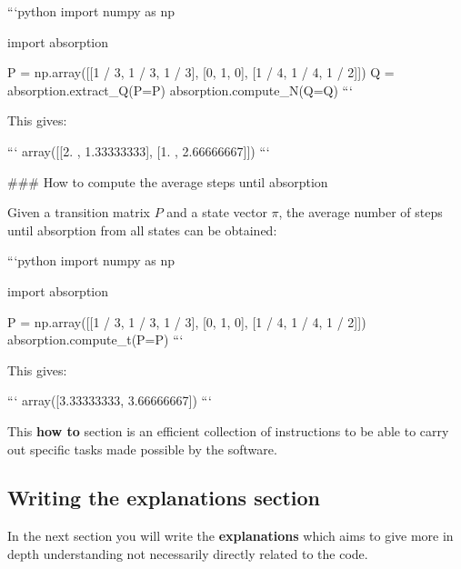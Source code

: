 \begin{md}
```python
import numpy as np

import absorption

P = np.array([[1 / 3, 1 / 3, 1 / 3], [0, 1, 0], [1 / 4, 1 / 4, 1 / 2]])
Q = absorption.extract_Q(P=P)
absorption.compute_N(Q=Q)
```

This gives:

```
array([[2.        , 1.33333333],
       [1.        , 2.66666667]])
```

### How to compute the average steps until absorption

Given a transition matrix $P$ and a state vector $\pi$, the average number of
steps until absorption from all states can be obtained:

```python
import numpy as np

import absorption

P = np.array([[1 / 3, 1 / 3, 1 / 3], [0, 1, 0], [1 / 4, 1 / 4, 1 / 2]])
absorption.compute_t(P=P)
```

This gives:

```
array([3.33333333, 3.66666667])
```
\end{md}

This \textbf{how to} section is an efficient collection of instructions to be
able to carry out specific tasks made possible by the software.


\subsection{Writing the explanations section}
\label{\detokenize{building-tools/06-documentation/tutorial/main:writing-the-explanations-section}}

In the next section you will write the \textbf{explanations} which aims to give more
in depth understanding not necessarily directly related to the code.

